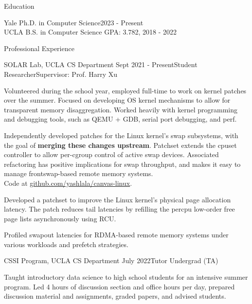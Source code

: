 \documentclass{resume} %
\begin{document}
\begin{resumeSection}{Education}

Yale Ph.D. in Computer Science\hfill 2023 - Present \\
UCLA B.S. in Computer Science
	\hfill GPA: 3.782, 2018 - 2022

\end{resumeSection}


\begin{resumeSection}{Professional Experience} \itemsep -12pt

\begin{resumeSubsection}{SOLAR Lab, UCLA CS Department} 
	{Sept 2021 - Present}{Student Researcher}{Supervisor: Prof. Harry Xu}
\item Volunteered during the school year, employed full-time to work on kernel
	patches over the summer. Focused on developing OS kernel mechanisms to
	allow for transparent memory disaggregation. Worked heavily with kernel
	programming and debugging tools, such as QEMU + GDB, serial port
	debugging, and perf. 
\item Independently developed patches for the Linux kernel's swap subsystems,
	with the goal of \textbf{merging these changes upstream}. Patchset
	extends the cpuset controller to allow per-cgroup control of active
	swap devices. Associated refactoring has positive implications for swap
	throughput, and makes it easy to manage frontswap-based remote memory
	systems. \\
	Code at 
	\href{https://github.com/yashlala/canvas-linux}{github.com/yashlala/canvas-linux}.
\item Developed a patchset to improve the Linux kernel's physical page
	allocation latency. The patch reduces tail latencies by refilling the
	percpu low-order free page lists asynchronously using RCU. 
\item Profiled swapout latencies for RDMA-based remote memory systems under
	various workloads and prefetch strategies. 
\end{resumeSubsection}

\begin{resumeSubsection}{CSSI Program, UCLA CS Department}
	{July 2022}{Tutor Undergrad (TA)}{}
\item Taught introductory data science to high school students for an intensive
	summer program. Led 4 hours of discussion section and office hours per
	day, prepared discussion material and assignments, graded papers, and
	advised students. 
\end{resumeSubsection}


\end{resumeSection}
\end{document}
